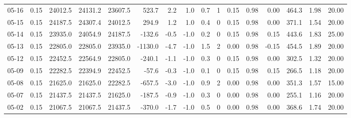 \begin{threeparttable}
{\begin{tabular}{lrrrrrrrrrrrrrrr}
  05-16 &     0.15 & 24012.5 & 24131.2 & 23607.5 &      523.7 &            2.2 &                      1.0 &                 0.7 &              1 &       0.15 &      0.98 &           0.00 &            464.3 &            1.98 &                  20.00 \\
  05-15 &     0.15 & 24187.5 & 24307.4 & 24012.5 &      294.9 &            1.2 &                      1.0 &                 0.4 &              0 &       0.15 &      0.98 &           0.00 &            371.1 &            1.54 &                  20.00 \\
  05-14 &     0.15 & 23935.0 & 24054.9 & 24187.5 &     -132.6 &           -0.5 &                     -1.0 &                 0.2 &              0 &       0.15 &      0.98 &           0.15 &            443.6 &            1.83 &                  25.00 \\
  05-13 &     0.15 & 22805.0 & 22805.0 & 23935.0 &    -1130.0 &           -4.7 &                     -1.0 &                 1.5 &              2 &       0.00 &      0.98 &          -0.15 &            454.5 &            1.89 &                  20.00 \\
  05-12 &     0.15 & 22452.5 & 22564.9 & 22805.0 &     -240.1 &           -1.1 &                     -1.0 &                 0.3 &              0 &       0.15 &      0.98 &           0.00 &            302.5 &            1.32 &                  20.00 \\
  05-09 &     0.15 & 22282.5 & 22394.9 & 22452.5 &      -57.6 &           -0.3 &                     -1.0 &                 0.1 &              0 &       0.15 &      0.98 &           0.15 &            266.5 &            1.18 &                  20.00 \\
  05-08 &     0.15 & 21625.0 & 21625.0 & 22282.5 &     -657.5 &           -3.0 &                     -1.0 &                 0.9 &              2 &       0.00 &      0.98 &           0.00 &            351.3 &            1.57 &                  15.00 \\
  05-07 &     0.15 & 21437.5 & 21437.5 & 21625.0 &     -187.5 &           -0.9 &                     -1.0 &                 0.3 &              0 &       0.00 &      0.98 &           0.00 &            255.1 &            1.16 &                  20.00 \\
  05-02 &     0.15 & 21067.5 & 21067.5 & 21437.5 &     -370.0 &           -1.7 &                     -1.0 &                 0.5 &              0 &       0.00 &      0.98 &           0.00 &            368.6 &            1.74 &                  20.00 \\

\end{tabular}}
\end{threeparttable}

